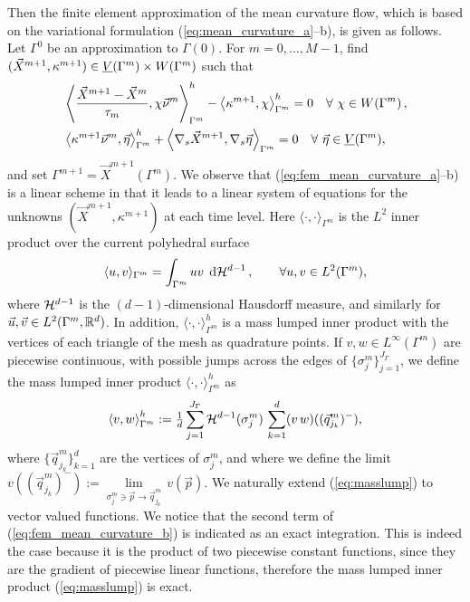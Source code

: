 Then the finite element approximation of the mean curvature flow, which is
based on the variational formulation (\ref{eq:mean_curvature_a}--b), is given
as follows. Let $\Gamma^0$ be an approximation to $\Gamma(0)$. For $m=0,\ldots,
M-1$, find $(\vec{X}^{m+1}, \kappa^{m+1}) \in \underline{V}(\Gamma^m) \times W(\Gamma^m)$
such that
\begin{subequations}
\begin{align}
&\left\langle \frac{\vec{X}^{m + 1} - \vec{X}^{m}}{\tau_m},
\chi\vec{\nu}^m\right\rangle_{\Gamma^m}^h - \left\langle\kappa^{m+1}, \chi
\right\rangle_{\Gamma^m}^h=0\quad \forall\ \chi \in
W(\Gamma^m)\,,\label{eq:fem_mean_curvature_a}\\
&\left\langle\kappa^{m+1}\vec{\nu}^m, \vec{\eta}\right\rangle_{\Gamma^m}^{h} +
\left\langle\nabla_s\vec{X}^{m + 1},
\nabla_s\vec{\eta}\right\rangle_{\Gamma^m}=0\quad \forall\ \vec\eta \in \underline{V}(\Gamma^m),
\label{eq:fem_mean_curvature_b}
\end{align}
\end{subequations}
and set $\Gamma^{m+1} = \vec{X}^{m+1}(\Gamma^m)$. We observe that
(\ref{eq:fem_mean_curvature_a}--b) is a linear scheme in that it leads to a
linear system of equations for the unknowns $(\vec{X}^{m+1}, \kappa^{m+1})$ at
each time level. Here $\langle\cdot,\cdot\rangle_{\Gamma^m}$ is the $L^2$ inner
product over the current polyhedral surface
\begin{equation}
\langle u,v\rangle_{\Gamma^m} =
\int_{\Gamma^m}uv\,\;{\rm d}{\cal H}^{d-1}\,, \qquad\forall u,v \in
L^2(\Gamma^m),
\end{equation}
where $\mathcal{H}^{d-1}$ is the $(d-1)$-dimensional Hausdorff measure, and
similarly for $\vec{u},\vec{v}\in L^2(\Gamma^m,{\mathbb R}^d)$. In addition,
$\langle \cdot,\cdot\rangle_{\Gamma^m}^h$ is a mass lumped inner product with
the vertices of each triangle of the mesh as quadrature points. If $v,w \in
L^\infty(\Gamma^m)$ are piecewise continuous, with possible jumps
across the edges of $\{\sigma_j^m\}_{j=1}^{J_\Gamma}$, we define the mass
lumped inner product $\langle\cdot,\cdot\rangle_{\Gamma^m}^h$ as
\begin{equation} \label{eq:masslump}
\left\langle v, w \right\rangle^h_{\Gamma^m} :=
\tfrac1d \sum_{j=1}^{J_\Gamma} \mathcal{H}^{d-1}(\sigma^m_j)\,
\sum_{k=1}^{d} (v\,w)((\vec{q}^m_{j_k})^-),
\end{equation}
where $\{\vec{q}^m_{j_k}\}_{k=1}^{d}$ are the vertices of $\sigma^m_j$, and
where we define the limit $v((\vec{q}^m_{j_k})^-)
:= \underset{\sigma^m_j\ni \vec{p}\to \vec{q}^m_{j_k}}{\lim}\, v(\vec{p})$. We
naturally extend (\ref{eq:masslump}) to vector valued functions. We notice that
the second term of (\ref{eq:fem_mean_curvature_b}) is indicated as an exact
integration. This is indeed the case because it is the product of two
piecewise constant functions, since they are the gradient of piecewise linear
functions, therefore the mass lumped inner product (\ref{eq:masslump}) is
exact.

